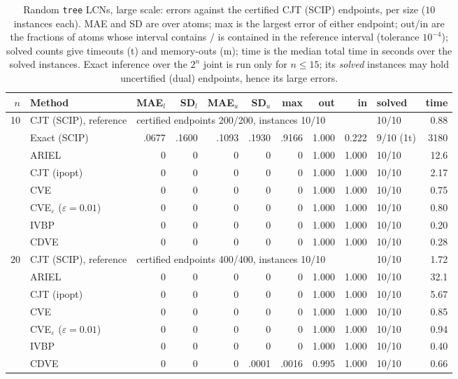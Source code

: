 \begin{table}[htbp]
\centering
\scriptsize
\caption{Random \texttt{tree} LCNs, large scale: errors against the certified CJT (SCIP) endpoints, per size ($10$ instances each). MAE and SD are over atoms; max is the largest error of either endpoint; out/in are the fractions of atoms whose interval contains / is contained in the reference interval (tolerance $10^{-4}$); solved counts give timeouts (t) and memory-outs (m); time is the median total time in seconds over the solved instances. Exact inference over the $2^n$ joint is run only for $n \le 15$; its \emph{solved} instances may hold uncertified (dual) endpoints, hence its large errors.}
\label{tab:full-tree-large}
\begin{tabular}{rlrrrrrrrlr}
\toprule
$n$ & Method & MAE$_l$ & SD$_l$ & MAE$_u$ & SD$_u$ & max & out & in & solved & time \\
\midrule
10 & CJT (SCIP), reference & \multicolumn{7}{l}{certified endpoints 200/200, instances 10/10} & 10/10 & 0.88 \\
 & Exact (SCIP) & .0677 & .1600 & .1093 & .1930 & .9166 & 1.000 & 0.222 & 9/10 (1t) & 3180 \\
 & ARIEL & 0 & 0 & 0 & 0 & 0 & 1.000 & 1.000 & 10/10 & 12.6 \\
 & CJT (ipopt) & 0 & 0 & 0 & 0 & 0 & 1.000 & 1.000 & 10/10 & 2.17 \\
 & CVE & 0 & 0 & 0 & 0 & 0 & 1.000 & 1.000 & 10/10 & 0.75 \\
 & CVE$_\varepsilon$ ($\varepsilon{=}0.01$) & 0 & 0 & 0 & 0 & 0 & 1.000 & 1.000 & 10/10 & 0.80 \\
 & IVBP & 0 & 0 & 0 & 0 & 0 & 1.000 & 1.000 & 10/10 & 0.20 \\
 & CDVE & 0 & 0 & 0 & 0 & 0 & 1.000 & 1.000 & 10/10 & 0.28 \\
\midrule
20 & CJT (SCIP), reference & \multicolumn{7}{l}{certified endpoints 400/400, instances 10/10} & 10/10 & 1.72 \\
 & ARIEL & 0 & 0 & 0 & 0 & 0 & 1.000 & 1.000 & 10/10 & 32.1 \\
 & CJT (ipopt) & 0 & 0 & 0 & 0 & 0 & 1.000 & 1.000 & 10/10 & 5.67 \\
 & CVE & 0 & 0 & 0 & 0 & 0 & 1.000 & 1.000 & 10/10 & 0.85 \\
 & CVE$_\varepsilon$ ($\varepsilon{=}0.01$) & 0 & 0 & 0 & 0 & 0 & 1.000 & 1.000 & 10/10 & 0.94 \\
 & IVBP & 0 & 0 & 0 & 0 & 0 & 1.000 & 1.000 & 10/10 & 0.40 \\
 & CDVE & 0 & 0 & 0 & .0001 & .0016 & 0.995 & 1.000 & 10/10 & 0.66 \\

\end{tabular}
\end{table}
